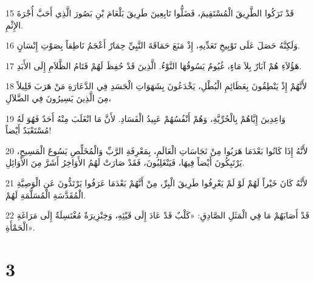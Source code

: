 \par 15 قَدْ تَرَكُوا الطَّرِيقَ الْمُسْتَقِيمَ، فَضَلُّوا تَابِعِينَ طَرِيقَ بَلْعَامَ بْنِ بَصُورَ الَّذِي أَحَبَّ أُجْرَةَ الإِثْمِ.
\par 16 وَلَكِنَّهُ حَصَلَ عَلَى تَوْبِيخِ تَعَدِّيهِ، إِذْ مَنَعَ حَمَاقَةَ النَّبِيِّ حِمَارٌ أَعْجَمُ نَاطِقاً بِصَوْتِ إِنْسَانٍ.
\par 17 هَؤُلاَءِ هُمْ آبَارٌ بِلاَ مَاءٍ، غُيُومٌ يَسُوقُهَا النَّوْءُ. الَّذِينَ قَدْ حُفِظَ لَهُمْ قَتَامُ الظَّلاَمِ إِلَى الأَبَدِ.
\par 18 لأَنَّهُمْ إِذْ يَنْطِقُونَ بِعَظَائِمِ الْبُطْلِ، يَخْدَعُونَ بِشَهَوَاتِ الْجَسَدِ فِي الدَّعَارَةِ مَنْ هَرَبَ قَلِيلاً مِنَ الَّذِينَ يَسِيرُونَ فِي الضَّلاَلِ،
\par 19 وَاعِدِينَ إِيَّاهُمْ بِالْحُرِّيَّةِ، وَهُمْ أَنْفُسُهُمْ عَبِيدُ الْفَسَادِ. لأَنَّ مَا انْغَلَبَ مِنْهُ أَحَدٌ فَهُوَ لَهُ مُسْتَعْبَدٌ أَيْضاً!
\par 20 لأَنَّهُ إِذَا كَانُوا بَعْدَمَا هَرَبُوا مِنْ نَجَاسَاتِ الْعَالَمِ، بِمَعْرِفَةِ الرَّبِّ وَالْمُخَلِّصِ يَسُوعَ الْمَسِيحِ، يَرْتَبِكُونَ أَيْضاً فِيهَا، فَيَنْغَلِبُونَ، فَقَدْ صَارَتْ لَهُمُ الأَوَاخِرُ أَشَرَّ مِنَ الأَوَائِلِ.
\par 21 لأَنَّهُ كَانَ خَيْراً لَهُمْ لَوْ لَمْ يَعْرِفُوا طَرِيقَ الْبِرِّ، مِنْ أَنَّهُمْ بَعْدَمَا عَرَفُوا يَرْتَدُّونَ عَنِ الْوَصِيَّةِ الْمُقَدَّسَةِ الْمُسَلَّمَةِ لَهُمْ.
\par 22 قَدْ أَصَابَهُمْ مَا فِي الْمَثَلِ الصَّادِقِ: «كَلْبٌ قَدْ عَادَ إِلَى قَيْئِهِ، وَخِنْزِيرَةٌ مُغْتَسِلَةٌ إِلَى مَرَاغَةِ الْحَمْأَةِ».

\chapter{3}

